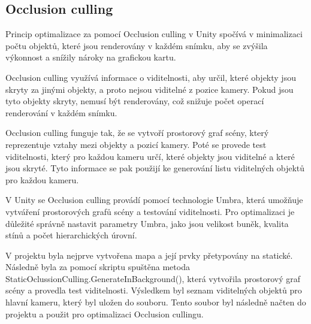 \subsection{Occlusion culling}
Princip optimalizace za pomocí Occlusion culling v Unity spočívá v minimalizaci počtu objektů, které jsou renderovány v každém snímku, aby se zvýšila výkonnost a snížily nároky na grafickou kartu.

Occlusion culling využívá informace o viditelnosti, aby určil, které objekty jsou skryty za jinými objekty, a proto nejsou viditelné z pozice kamery. Pokud jsou tyto objekty skryty, nemusí být renderovány, což snižuje počet operací renderování v každém snímku.

Occlusion culling funguje tak, že se vytvoří prostorový graf scény, který reprezentuje vztahy mezi objekty a pozicí kamery. Poté se provede test viditelnosti, který pro každou kameru určí, které objekty jsou viditelné a které jsou skryté. Tyto informace se pak použijí ke generování listu viditelných objektů pro každou kameru.

V Unity se Occlusion culling provádí pomocí technologie Umbra, která umožňuje vytváření prostorových grafů scény a testování viditelnosti. Pro optimalizaci je důležité správně nastavit parametry Umbra, jako jsou velikost buněk, kvalita stínů a počet hierarchických úrovní.

V projektu byla nejprve vytvořena mapa a její prvky přetypovány na statické. Následně byla za pomocí skriptu spuštěna metoda StaticOclussionCulling.GenerateInBackground(), která vytvořila prostorový graf scény a provedla test viditelnosti. Výsledkem byl seznam viditelných objektů pro hlavní kameru, který byl uložen do souboru. Tento soubor byl následně načten do projektu a použit pro optimalizaci Occlusion cullingu.


